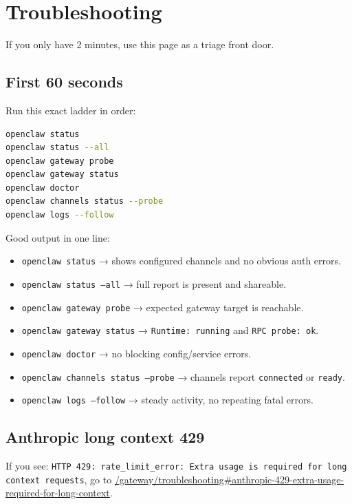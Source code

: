 \clearpage

\section{Troubleshooting}


If you only have 2 minutes, use this page as a triage front door.

\subsection{First 60 seconds}


Run this exact ladder in order:

\begin{lstlisting}[language=bash]
openclaw status
openclaw status --all
openclaw gateway probe
openclaw gateway status
openclaw doctor
openclaw channels status --probe
openclaw logs --follow
\end{lstlisting}


Good output in one line:

\begin{itemize}
  \item \texttt{openclaw status} → shows configured channels and no obvious auth errors.
  \item \texttt{openclaw status --all} → full report is present and shareable.
  \item \texttt{openclaw gateway probe} → expected gateway target is reachable.
  \item \texttt{openclaw gateway status} → \texttt{Runtime: running} and \texttt{RPC probe: ok}.
  \item \texttt{openclaw doctor} → no blocking config/service errors.
  \item \texttt{openclaw channels status --probe} → channels report \texttt{connected} or \texttt{ready}.
  \item \texttt{openclaw logs --follow} → steady activity, no repeating fatal errors.
\end{itemize}


\subsection{Anthropic long context 429}


If you see:
\texttt{HTTP 429: rate\_limit\_error: Extra usage is required for long context requests},
go to \href{/gateway/troubleshooting\#anthropic-429-extra-usage-required-for-long-context}{/gateway/troubleshooting\#anthropic-429-extra-usage-required-for-long-context}.

